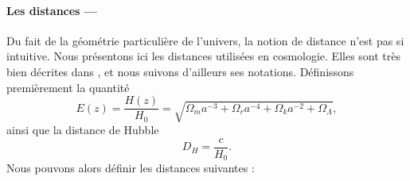\documentclass[11pt, twoside, a4paper, openright]{report}
\begin{document}
\paragraph{Les distances —}
Du fait de la géométrie particulière de l'univers, la notion de distance n'est pas si intuitive. Nous présentons ici les distances utilisées en cosmologie. Elles sont très bien décrites dans \cite{CITE: Hogg 1999}, et nous suivons d'ailleurs ses notations. Définissons premièrement la quantité
\begin{equation}
  \label{eq:dist_ez}
  E(z) = \frac{H(z)}{H_0} 
  = \sqrt{\Omega_m a^{-3} + \Omega_r a^{-4} + \Omega_k a^{-2} + \Omega_{\Lambda}} ,
\end{equation}
ainsi que la distance de Hubble
\begin{equation}
  \label{eq:dist_hubble}
  D_H = \frac{c}{H_0} .
\end{equation}
Nous pouvons alors définir les distances suivantes :
\end{document}
